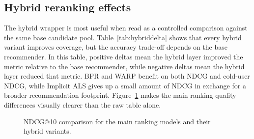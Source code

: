 \documentclass[sigconf,nonacm]{acmart}
\begin{document}
\subsection{Hybrid reranking effects}
The hybrid wrapper is most useful when read as a controlled comparison against the same base candidate pool. Table~\ref{tab:hybriddelta} shows that every hybrid variant improves coverage, but the accuracy trade-off depends on the base recommender. In this table, positive deltas mean the hybrid layer improved the metric relative to the base recommender, while negative deltas mean the hybrid layer reduced that metric. BPR and WARP benefit on both NDCG and cold-user NDCG, while Implicit ALS gives up a small amount of NDCG in exchange for a broader recommendation footprint. Figure~\ref{fig:ndcgbars} makes the main ranking-quality differences visually clearer than the raw table alone.

\begin{table}[t]
  \caption{Hybrid-vs.-base deltas. The hybrid wrapper broadens coverage across all reported base recommenders, but the effect on NDCG depends on the underlying collaborative model.}
  \label{tab:hybriddelta}
  \centering
  \footnotesize
  \setlength{\tabcolsep}{4pt}
\end{table}

\begin{figure}[t]
  \centering
  \caption{NDCG@10 comparison for the main ranking models and their hybrid variants.}
  \label{fig:ndcgbars}
\end{figure}
\end{document}
